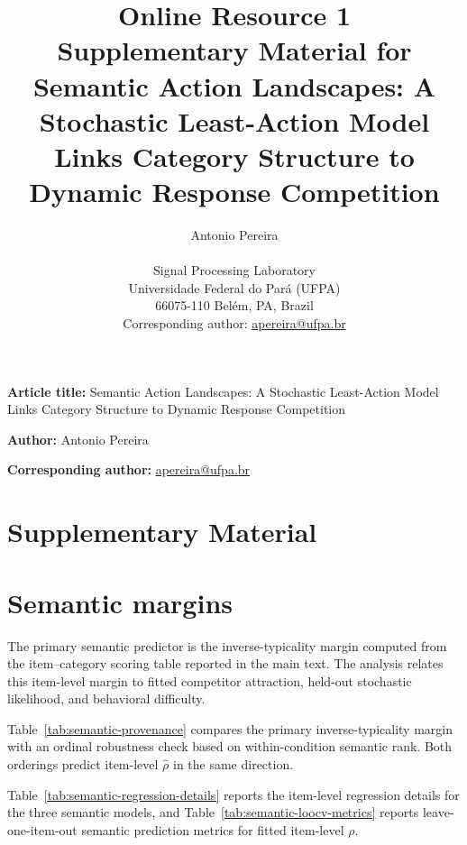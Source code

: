 \documentclass[11pt,final]{article}
\title{Online Resource 1\\Supplementary Material for\\
Semantic Action Landscapes: A Stochastic Least-Action Model Links Category Structure to Dynamic Response Competition}
\author{%
Antonio Pereira\\[0.4em]
\parbox{0.82\textwidth}{\centering
Signal Processing Laboratory\\
Universidade Federal do Par\'a (UFPA)\\
66075-110 Bel\'em, PA, Brazil\\
Corresponding author: \href{mailto:apereira@ufpa.br}{apereira@ufpa.br}}}
\date{}
\begin{document}
\maketitle

\noindent\textbf{Article title:} Semantic Action Landscapes: A Stochastic Least-Action Model Links Category Structure to Dynamic Response Competition

\noindent\textbf{Author:} Antonio Pereira

\noindent\textbf{Corresponding author:} \href{mailto:apereira@ufpa.br}{apereira@ufpa.br}

\vspace{1em}

\doublespacing

\setcounter{table}{0}
\renewcommand{\thetable}{S\arabic{table}}
\setcounter{figure}{0}
\renewcommand{\thefigure}{S\arabic{figure}}
\setcounter{section}{0}
\renewcommand{\thesection}{S\arabic{section}}

\section*{Supplementary Material}

\section{Semantic margins}
\label{sec:supp-semantic-provenance}

The primary semantic predictor is the inverse-typicality margin computed from the item--category scoring table reported in the main text. The analysis relates this item-level margin to fitted competitor attraction, held-out stochastic likelihood, and behavioral difficulty.

Table~\ref{tab:semantic-provenance} compares the primary inverse-typicality margin with an ordinal robustness check based on within-condition semantic rank. Both orderings predict item-level $\hat{\rho}$ in the same direction.



Table~\ref{tab:semantic-regression-details} reports the item-level regression details for the three semantic models, and Table~\ref{tab:semantic-loocv-metrics} reports leave-one-item-out semantic prediction metrics for fitted item-level $\rho$.




\end{document}
